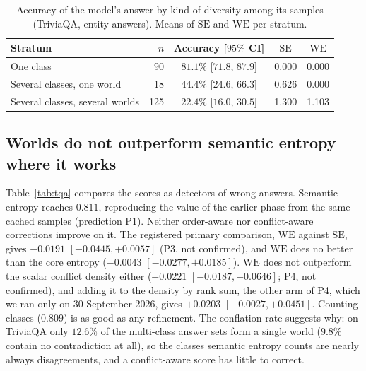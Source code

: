 \documentclass[english]{desafiokunumi}
\theoremstyle{definition}
\theoremstyle{remark}
\newcommand{\SE}{\mathrm{SE}}
\newcommand{\WE}{\mathrm{WE}}
\begin{document}
\begin{table}[ht]
  \centering
  \caption{Accuracy of the model's answer by kind of diversity among its
  samples (TriviaQA, entity answers). Means of $\SE$ and $\WE$ per stratum.}
  \label{tab:estratos}
  \small
  \begin{tabular}{@{}lrccc@{}}
    \toprule
    \textbf{Stratum} & $n$ & \textbf{Accuracy} [$95\%$ CI] & $\SE$ & $\WE$ \\
    \midrule
    One class                          & 90  & $81.1\%$ [$71.8$, $87.9$] & 0.000 & 0.000 \\
    Several classes, one world         & 18  & $44.4\%$ [$24.6$, $66.3$] & 0.626 & 0.000 \\
    Several classes, several worlds    & 125 & $22.4\%$ [$16.0$, $30.5$] & 1.300 & 1.103 \\
    \bottomrule
  \end{tabular}
\end{table}

\subsection{Worlds do not outperform semantic entropy where it works}
\label{sec:res-p3}

Table~\ref{tab:tqa} compares the scores as detectors of wrong answers. Semantic
entropy reaches $0.811$, reproducing the value of the earlier phase from the
same cached samples (prediction P1). Neither order-aware nor conflict-aware
corrections improve on it. The registered primary comparison, $\WE$ against
$\SE$, gives $-0.0191$ $[-0.0445, +0.0057]$ (P3, not confirmed), and $\WE$
does no better than the core entropy ($-0.0043$ $[-0.0277, +0.0185]$). $\WE$
does not outperform the scalar conflict density either ($+0.0221$
$[-0.0187, +0.0646]$; P4, not confirmed), and adding it to the density by rank
sum, the other arm of P4, which we ran only on 30 September 2026, gives
$+0.0203$ $[-0.0027, +0.0451]$. Counting classes ($0.809$) is as good as any
refinement. The conflation rate suggests why: on TriviaQA only $12.6\%$ of the multi-class
answer sets form a single world ($9.8\%$ contain no contradiction at all), so
the classes semantic entropy counts are nearly always disagreements, and a
conflict-aware score has little to correct.
\end{document}

